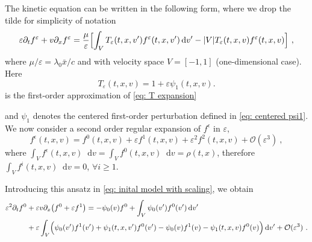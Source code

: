 \documentclass[11pt,twoside]{article}
\numberwithin{equation}{section}
\newcommand*\diff{\mathop{}\!\mathrm{d}}
\theoremstyle{plain}
\theoremstyle{nonumberplain}
\newcommand{\e}{\epsilon}
\begin{document}
The kinetic equation can be written in the following form, where we  drop the tilde for simplicity of notation 
{
\begin{equation}
    \varepsilon \partial_t f^\varepsilon+{v}\partial_x f^\varepsilon = \frac{\mu}{\varepsilon}\Bigl[\int_V T_\varepsilon(t,x,v')f^\varepsilon(t,x,v')\diff v'-|V|T_\varepsilon(t,x,v)f^\varepsilon(t,x,v)\Bigr]\ , \label{eq: inital model with scaling}
\end{equation}}where $\mu/\varepsilon=\lambda_0 \bar{x}/c$ and with velocity space \( V = [-1,1] \) (one-dimensional case). 
Here 
\begin{equation}\label{eq: T app}
T_\varepsilon(t,x,v)
=
1+\varepsilon\psi_1(t,x,v).
\end{equation} 
is the first-order approximation of \eqref{eq: T expansion}
{and \(\psi_1\) denotes the centered first-order perturbation defined in \eqref{eq: centered psi1}.
We now consider a second order regular expansion of $f^\e$ in $\varepsilon$, 
\begin{equation*}
f^\e(t,{x},{v})=f^0(t,{x},{v})+\varepsilon f^1(t,{x},{v})+\varepsilon^2 f^2(t,{x},{v})+\mathcal{O}(\varepsilon^3)\ , 
\end{equation*}
where $\int_V f^\e(t,{x},{v})\diff {v} = \int_V f^0(t,{x},{v})\diff {v} = \rho(t,{x})$, therefore $\int_V f^i(t,{x},{v})\diff {v}=0$, $\forall i\geq 1$.






Introducing this ansatz in \eqref{eq: inital model with scaling}, we obtain
\iffalse
{\begin{align*}
    \varepsilon^2\partial_t f^0&+\varepsilon{v}\partial_x\big(f^0+\varepsilon f^1  \big) 
    =-\psi_0(v) f^0+\int_V\psi_0(v')f^0(v')\diff v'\\
    &+\varepsilon\int_V\Bigl(\psi_0(v')f^1(v')+\psi_1(t,x,v')f^0(v')-\psi_0(v)f^1(v)-\psi_1(t,x,v)f^0(v) \Bigr)\diff v'+{\mathcal{O}(\varepsilon^3)}
      \ .
\end{align*}}

}
\end{document}
